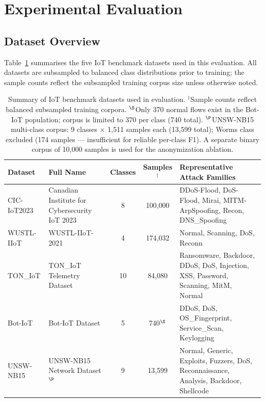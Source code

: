 
\section{Experimental Evaluation}\label{sec:evaluation}

\subsection{Dataset Overview}\label{subsec:datasets}

Table~\ref{tab:datasets} summarises the five IoT benchmark datasets used in
this evaluation. All datasets are subsampled to balanced class distributions
prior to training; the sample counts reflect the subsampled training corpus
size unless otherwise noted.

\begin{table}[htbp]
\centering
\caption{Summary of IoT benchmark datasets used in evaluation.
  $^\dagger$Sample counts reflect balanced subsampled training corpora.
  $^\S$Only 370 normal flows exist in the Bot-IoT population; corpus is limited to 370 per class (740 total).
  $^\P$UNSW-NB15 multi-class corpus: 9 classes $\times$ 1{,}511 samples each (13{,}599 total);
  Worms class excluded (174 samples — insufficient for reliable per-class F1).
  A separate binary corpus of 10{,}000 samples is used for the anonymization ablation.}
\label{tab:datasets}
\begin{tabular}{llccl}
\toprule
\textbf{Dataset} & \textbf{Full Name} & \textbf{Classes} & \textbf{Samples}$^\dagger$ & \textbf{Representative Attack Families} \\
\midrule
CIC-IoT2023   & Canadian Institute for Cybersecurity IoT 2023 & 8  & 100{,}000 & DDoS-Flood, DoS-Flood, Mirai, MITM-ArpSpoofing, Recon, DNS\_Spoofing \\
WUSTL-IIoT    & WUSTL-IIoT-2021                               & 4  & 174{,}032 & Normal, Scanning, DoS, Reconn \\
TON\_IoT      & TON\_IoT Telemetry Dataset                    & 10 & 84{,}080   & Ransomware, Backdoor, DDoS, DoS, Injection, XSS, Password, Scanning, MitM, Normal \\
Bot-IoT       & Bot-IoT Dataset                               & 5  & 740$^\S$   & DDoS, DoS, OS\_Fingerprint, Service\_Scan, Keylogging \\
UNSW-NB15     & UNSW-NB15 Network Dataset$^\P$                & 9  & 13{,}599  & Normal, Generic, Exploits, Fuzzers, DoS, Reconnaissance, Analysis, Backdoor, Shellcode \\
\bottomrule
\end{tabular}
\end{table}

